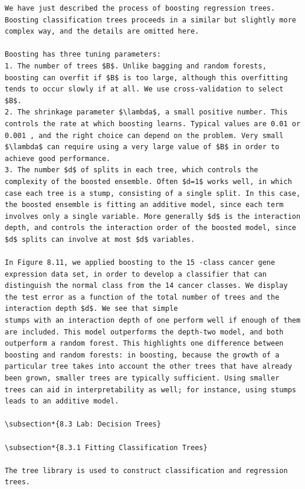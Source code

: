 \documentclass[10pt]{article}
\begin{document}
\begin{verbatim}
We have just described the process of boosting regression trees. Boosting classification trees proceeds in a similar but slightly more complex way, and the details are omitted here.

Boosting has three tuning parameters:
1. The number of trees $B$. Unlike bagging and random forests, boosting can overfit if $B$ is too large, although this overfitting tends to occur slowly if at all. We use cross-validation to select $B$.
2. The shrinkage parameter $\lambda$, a small positive number. This controls the rate at which boosting learns. Typical values are 0.01 or 0.001 , and the right choice can depend on the problem. Very small $\lambda$ can require using a very large value of $B$ in order to achieve good performance.
3. The number $d$ of splits in each tree, which controls the complexity of the boosted ensemble. Often $d=1$ works well, in which case each tree is a stump, consisting of a single split. In this case, the boosted ensemble is fitting an additive model, since each term involves only a single variable. More generally $d$ is the interaction depth, and controls the interaction order of the boosted model, since $d$ splits can involve at most $d$ variables.

In Figure 8.11, we applied boosting to the 15 -class cancer gene expression data set, in order to develop a classifier that can distinguish the normal class from the 14 cancer classes. We display the test error as a function of the total number of trees and the interaction depth $d$. We see that simple
stumps with an interaction depth of one perform well if enough of them are included. This model outperforms the depth-two model, and both outperform a random forest. This highlights one difference between boosting and random forests: in boosting, because the growth of a particular tree takes into account the other trees that have already been grown, smaller trees are typically sufficient. Using smaller trees can aid in interpretability as well; for instance, using stumps leads to an additive model.

\subsection*{8.3 Lab: Decision Trees}

\subsection*{8.3.1 Fitting Classification Trees}

The tree library is used to construct classification and regression trees.
\end{verbatim}
\end{document}
